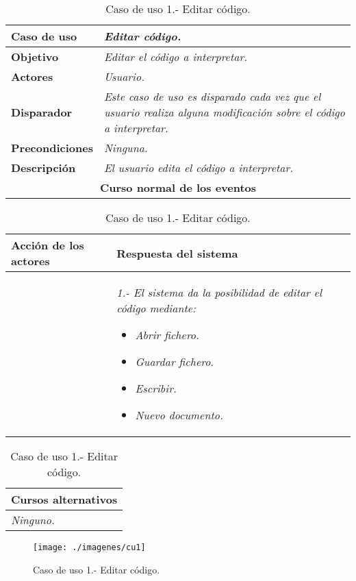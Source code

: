    \begin{table}[!ht] %
      \centering
      \begin{tabular}{|p{4cm}|p{11.5cm}|}
         \hline
         \textbf{Caso de uso} & \textit{Editar código.}\\ \hline
         \textbf{Objetivo} & \textit{Editar el código a interpretar.}\\ \hline
         \textbf{Actores} & \textit{Usuario.}\\ \hline
         \textbf{Disparador} & \textit{Este caso de uso es disparado cada vez que el usuario realiza alguna modificación sobre
                                 el código a interpretar.}\\ \hline
         \textbf{Precondiciones} & \textit{Ninguna.}\\ \hline
         \textbf{Descripción} & \textit{El usuario edita el código a interpretar.}\\ \hline
         \multicolumn{2}{|c|}{\textbf{Curso normal de los eventos}}\\ \hline
    \end{tabular}
    \begin{tabular}{|p{7.75cm}|p{7.75cm}|}
      \hspace{2cm}\textbf{Acción de los actores} & \hspace{1.75cm}\textbf{Respuesta del sistema}\\ \hline
            & \textit{1.- El sistema da la posibilidad de editar el código mediante:}
                     \begin{itemize}
                        \item \textit{Abrir fichero.}
                        \item \textit{Guardar fichero.}
                        \item \textit{Escribir.}
                        \item \textit{Nuevo documento.}
                     \end{itemize} \\ \hline
    \end{tabular}
    \begin{tabular}{|p{15.9cm}|}
      \hspace{6cm}\textbf{Cursos alternativos}\\ \hline
      \textit{Ninguno.}\\ \hline
    \end{tabular}
    \caption{Caso de uso 1.- Editar código.}
   \end{table} 
   \begin{figure} [H] \begin{center}
      \texttt{[image: ./imagenes/cu1]}\label{actores}
      \caption{Caso de uso 1.- Editar código.}
   \end{center} \end{figure}


